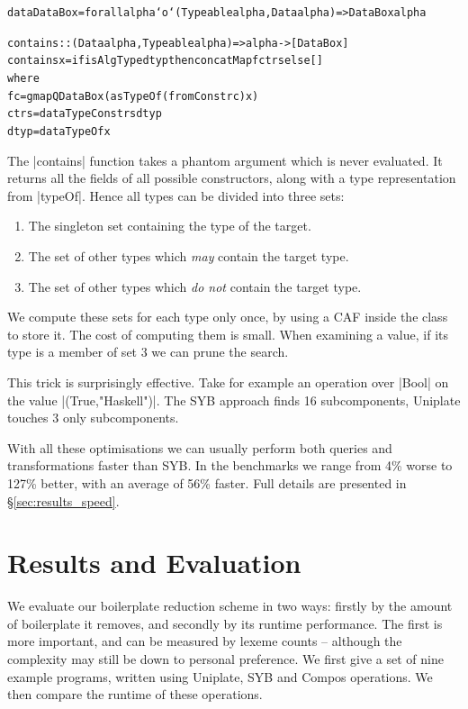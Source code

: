 \documentclass[preprint]{sigplanconf}
\newenvironment{code}{\begin{alltt}\small}{\end{alltt}}
\newcommand{\ignore}{}
\begin{document}
\ignore\begin{code}
data DataBox = forall alpha `o` (Typeable alpha, Data alpha) => DataBox alpha

contains :: (Data alpha, Typeable alpha) => alpha -> [DataBox]
contains x = if isAlgType dtyp then concatMap f ctrs else []
    where
        f c = gmapQ DataBox (asTypeOf (fromConstr c) x)
        ctrs = dataTypeConstrs dtyp
        dtyp = dataTypeOf x
\end{code}

The \ignore|contains| function takes a phantom argument which is never evaluated. It returns all the fields of all possible constructors, along with a type representation from |typeOf|. Hence all types can be divided into three sets:

\begin{enumerate}
\item The singleton set containing the type of the target.
\item The set of other types which \textit{may} contain the target type.
\item The set of other types which \textit{do not} contain the target type.
\end{enumerate}

We compute these sets for each type only once, by using a CAF inside the class to store it. The cost of computing them is small. When examining a value, if its type is a member of set 3 we can prune the search.

This trick is surprisingly effective. Take for example an operation over |Bool| on the value |(True,"Haskell")|. The SYB approach finds 16 subcomponents, Uniplate touches 3 only subcomponents.

With all these optimisations we can usually perform both queries and transformations faster than SYB. In the benchmarks we range from 4\% worse to 127\% better, with an average of 56\% faster. Full details are presented in \S\ref{sec:results_speed}.


\section{Results and Evaluation}
\label{sec:results}

We evaluate our boilerplate reduction scheme in two ways: firstly by the amount of boilerplate it removes, and secondly by its runtime performance. The first is more important, and can be measured by lexeme counts -- although the complexity may still be down to personal preference. We first give a set of nine example programs, written using Uniplate, SYB and Compos operations. We then compare the runtime of these operations.
\end{document}
